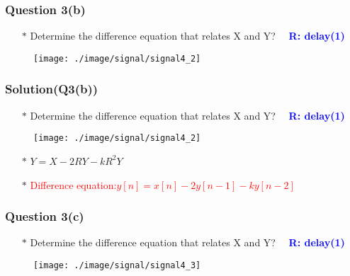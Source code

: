 \documentclass{beamer}
\newcommand{\blue}[1]{\textcolor{blue}{#1}}
\newcommand{\red}[1]{\textcolor{red}{#1}}
\begin{document}
\begin{frame}
\frametitle{Question 3(b)}

\begin{itemize} \itemsep1pt \parskip0pt 
  \item[$\ast$] Determine the difference equation that relates X and Y?  ~~\blue{\bf R: delay(1)}
\end{itemize}
\vspace{10 mm}


\begin{figure}[H]
  \centering
  \texttt{[image: ./image/signal/signal4\_2]}
\end{figure}


\end{frame}


\begin{frame}
\frametitle{Solution(Q3(b))}

\begin{itemize} \itemsep1pt \parskip0pt 
  \item[$\ast$] Determine the difference equation that relates X and Y?  ~~\blue{\bf R: delay(1)}
\end{itemize}



\begin{figure}[H]
  \centering
  \texttt{[image: ./image/signal/signal4\_2]}
\end{figure}

\begin{itemize} \itemsep1pt \parskip0pt 
  \item[$\ast$] $Y = X - 2RY -kR^2Y$
  \item[$\ast$] \red{Difference equation:$y[n] = x[n] - 2y[n-1] - ky[n-2]$}
\end{itemize}

\end{frame}


\begin{frame}
\frametitle{Question 3(c)}

\begin{itemize} \itemsep1pt \parskip0pt 
  \item[$\ast$] Determine the difference equation that relates X and Y?  ~~\blue{\bf R: delay(1)}
\end{itemize}
\vspace{20 mm}


\begin{figure}[H]
  \centering
  \texttt{[image: ./image/signal/signal4\_3]}
\end{figure}
\vspace{10 mm}

\end{frame}
\end{document}
